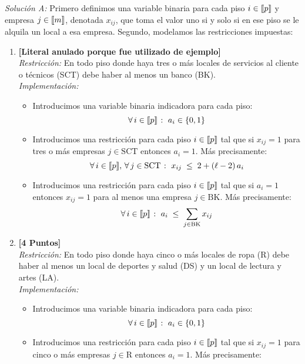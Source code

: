 \documentclass[ a4paper, twoside, 11pt]{article}
\begin{document}
\begin{problem}
\emph{Soluci\'on A:} Primero definimos una variable binaria para cada piso $i \in \llbracket p \rrbracket$ y empresa $j \in \llbracket m \rrbracket$, denotada $x_{ij}$, que toma el valor uno si y solo si en ese piso se le alquila un local a esa empresa. Segundo, modelamos las restricciones impuestas: 
\begin{enumerate}[label=\textbf{\alph*)}]
\item \textbf{[Literal anulado porque fue utilizado de ejemplo]} \\[1ex]
\emph{Restricci\'on:} En todo piso donde haya tres o m\'as locales de servicios al cliente o t\'ecnicos (SCT) debe haber al menos un banco (BK). \\[1ex]
\emph{Implementaci\'on:}
\begin{itemize}
\item Introducimos una variable binaria indicadora para cada piso: 
\[
\forall \, i \in \llbracket p \rrbracket \; \colon \; a_i \in \{ 0, 1 \}
\]
\item Introducimos una restricci\'on para cada piso $i \in \llbracket p \rrbracket$ tal que si $x_{ij} = 1$ para tres o m\'as empresas $j \in \text{SCT}$ entonces $a_i = 1$. M\'as precisamente: 
\[
\forall \, i \in \llbracket p \rrbracket, \, \forall \, j \in \text{SCT} \; \colon \;
x_{ij} \; \leq \; 2 + (\ell - 2) \, a_i
\]
\item Introducimos una restricci\'on para cada piso $i \in \llbracket p \rrbracket$ tal que si $a_i = 1$ entonces $x_{ij} = 1$ para al menos una empresa $j \in \text{BK}$. M\'as precisamente: 
\[
\forall \, i \in \llbracket p \rrbracket \; \colon \;
a_i \; \leq \; \sum_{j \in \text{BK}} x_{ij}
\]
\end{itemize}
\item \textbf{[4 Puntos]} \\[1ex]
\emph{Restricci\'on:} En todo piso donde haya cinco o m\'as locales de ropa (R) debe haber al menos un local de deportes y salud (DS) y un local de lectura y artes (LA). \\[1ex]
\emph{Implementaci\'on:}
\begin{itemize}
\item Introducimos una variable binaria indicadora para cada piso: 
\[
\forall \, i \in \llbracket p \rrbracket \; \colon \; a_i \in \{ 0, 1 \}
\]
\item Introducimos una restricci\'on para cada piso $i \in \llbracket p \rrbracket$ tal que si $x_{ij} = 1$ para cinco o m\'as empresas $j \in \text{R}$ entonces $a_i = 1$. M\'as precisamente: 

\end{itemize}
\end{enumerate}
\end{problem}
\end{document}
